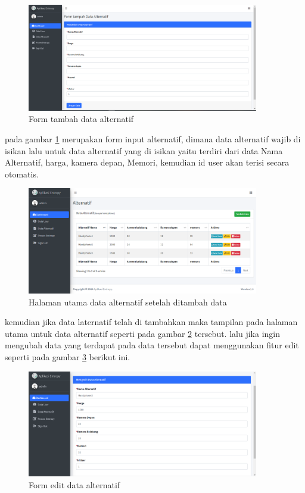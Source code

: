 \begin{figure}[!htbp]
	\centerline{\includegraphics[width=0.90\textwidth]{figures/alte/2.png}}
	\caption{Form tambah data alternatif}
	\label{al2}
\end{figure}
	pada gambar \ref{al2} merupakan form input alternatif, dimana data alternatif wajib di isikan lalu untuk data alternatif yang di isikan yaitu terdiri dari data Nama Alternatif, harga, kamera depan, Memori, kemudian id user akan terisi secara otomatis.
\begin{figure}[!htbp]
	\centerline{\includegraphics[width=0.90\textwidth]{figures/alte/3.png}}
	\caption{Halaman utama data alternatif setelah ditambah data}
	\label{al3}
\end{figure}
kemudian jika data laternatif telah di tambahkan maka tampilan pada halaman utama untuk data alternatif seperti pada gambar \ref{al3} tersebut. lalu jika ingin mengubah data yang terdapat pada data tersebut dapat menggunakan fitur edit seperti pada gambar \ref{al4} berikut ini.
\begin{figure}[!htbp]
	\centerline{\includegraphics[width=0.90\textwidth]{figures/alte/4.png}}
	\caption{Form edit data alternatif}
	\label{al4}
\end{figure}
